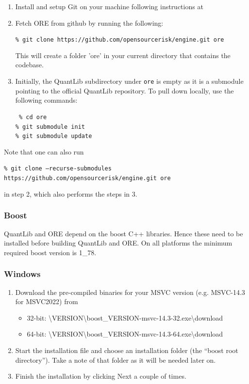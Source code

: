 \documentclass[12pt, a4paper]{article}
\newcommand{\bs}{\textbackslash}
\begin{document}
\begin{enumerate}
\item Install and setup Git on your machine following instructions at \cite{git-download}

\item Fetch ORE from github by running the following: 

{\tt\% git clone https://github.com/opensourcerisk/engine.git ore}      

This will create a folder 'ore' in your current directory that contains the codebase.

\item Initially, the QuantLib subdirectory under {\tt ore} is empty as it is a submodule pointing to the official
  QuantLib repository. To pull down locally, use the following commands:

{\tt
\% cd ore \\
\% git submodule init \\
\% git submodule update
}

\end{enumerate}

Note that one can also run 

{\footnotesize \tt\% git clone --recurse-submodules https://github.com/opensourcerisk/engine.git ore}

in step 2, which also performs the steps in 3.

\subsubsection{Boost}\label{sec:boost}

QuantLib and ORE depend on the boost C++ libraries. Hence these need to be installed before building QuantLib and
ORE. On all platforms the minimum required boost version is 1\_78.

\subsubsection*{Windows}

\begin{enumerate}
\item Download the pre-compiled binaries for your MSVC version (e.g. MSVC-14.3 for MSVC2022) from \cite{boost-binaries}
\begin{itemize}
\item 32-bit: \cite{boost-binaries}{\bs}VERSION{\bs}boost\_VERSION-msvc-14.3-32.exe{\bs}download 
\item 64-bit: \cite{boost-binaries}{\bs}VERSION{\bs}boost\_VERSION-msvc-14.3-64.exe{\bs}download
\end{itemize}
\item Start the installation file and choose an installation folder (the ``boost root directory''). Take a note of that folder as it will be needed later on.   
\item Finish the installation by clicking Next a couple of times.
\end{enumerate}
    
\end{document}
